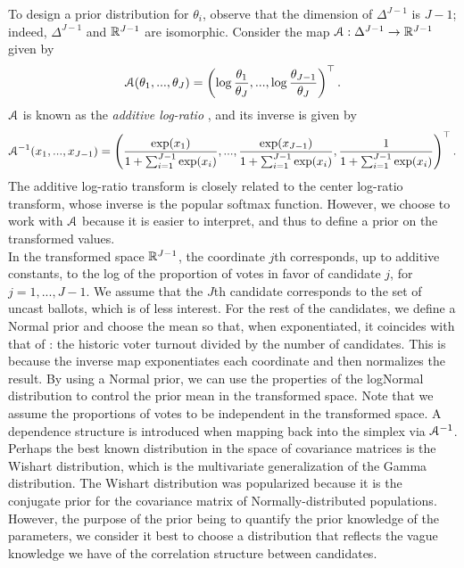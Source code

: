 \documentclass{article}
\begin{document}
To design a prior distribution for $\theta_i$, observe that the dimension of $\Delta^{J-1}$ is $J-1$; indeed, $\Delta^{J-1}$ and $\mathbb{R}^{J-1}$ are isomorphic. Consider the map $\mathcal{A}: \Delta^{J-1} \to \mathbb{R}^{J-1}$ given by
\[
  \mathcal{A} (\theta_1, ..., \theta_J) = \left( \log \frac{\theta_1}{\theta_J}, ..., \log \frac{\theta_{J-1}}{\theta_J} \right)^\top.
\]
$\mathcal{A}$ is known as the \textit{additive log-ratio} \citep{aitchison1982}, and its inverse is given by
\[
  \mathcal{A}^{-1} (x_1, ..., x_{J-1}) = \left( \frac{\exp(x_1)}{1 + \sum_{i=1}^{J-1} \exp(x_i)}, ..., \frac{\exp(x_{J-1})}{1 + \sum_{i=1}^{J-1} \exp(x_i)}, \frac{1}{1 + \sum_{i=1}^{J-1} \exp(x_i)} \right)^\top.
\]
The additive log-ratio transform is closely related to the center log-ratio transform, whose inverse is the popular softmax function. However, we choose to work with $\mathcal{A}$ because it is easier to interpret, and thus to define a prior on the transformed values. \\

In the transformed space $\mathbb{R}^{J-1}$, the coordinate $j$th corresponds, up to additive constants, to the log of the proportion of votes in favor of candidate $j$, for $j=1, ..., J-1$. We assume that the $J$th candidate corresponds to the set of uncast ballots, which is of less interest. For the rest of the candidates, we define a Normal prior and choose the mean so that, when exponentiated, it coincides with that of \citet{diluvi2018}: the historic voter turnout divided by the number of candidates. This is because the inverse map exponentiates each coordinate and then normalizes the result. By using a Normal prior, we can use the properties of the logNormal distribution to control the prior mean in the transformed space. Note that we assume the proportions of votes to be independent in the transformed space. A dependence structure is introduced when mapping back into the simplex via $\mathcal{A}^{-1}$.
\\


Perhaps the best known distribution in the space of covariance matrices is the Wishart distribution, which is the multivariate generalization of the Gamma distribution. The Wishart distribution was popularized because it is the conjugate prior for the covariance matrix of Normally-distributed populations. However, the purpose of the prior being to quantify the prior knowledge of the parameters, we consider it best to choose a distribution that reflects the vague knowledge we have of the correlation structure between candidates.
\\
\end{document}
